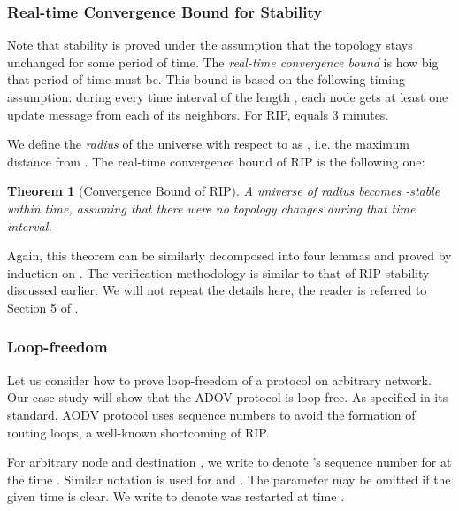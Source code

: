 \documentclass[a4paper,10pt,twocolumn]{article}
\newtheorem{theorem}{Theorem}
\begin{document}
\subsubsection{Real-time Convergence Bound for Stability}
Note that stability is proved under the assumption that the topology stays unchanged for some period of time. The \emph{real-time convergence bound} is how big that period of time must be. This bound is based on the following timing assumption: during every time interval of the length , each node gets at least one update message from each of its neighbors. For RIP,  equals 3 minutes.

We define the \emph{radius} of the universe with respect to  as , i.e. the maximum distance from . The real-time convergence bound of RIP is the following one:
\begin{theorem}[Convergence Bound of RIP]
A universe of radius  becomes -stable within  time, assuming that there were no topology changes during that time interval.
\end{theorem}

Again, this theorem can be similarly decomposed into four lemmas and proved by induction on . The verification methodology is similar to that of RIP stability discussed earlier. We will not repeat the details here, the reader is referred to Section 5 of \cite{BOG02}.

\subsubsection{Loop-freedom}
Let us consider how to prove loop-freedom of a protocol on arbitrary network. Our case study will show that the ADOV protocol is loop-free. As specified in its standard, AODV protocol uses sequence numbers to avoid the formation of routing loops, a well-known shortcoming of RIP.

For arbitrary node  and destination , we write  to denote 's sequence number for  at the time . Similar notation is used for  and . The parameter  may be omitted if the given time is clear. We write  to denote  was restarted at time .
\end{document}
